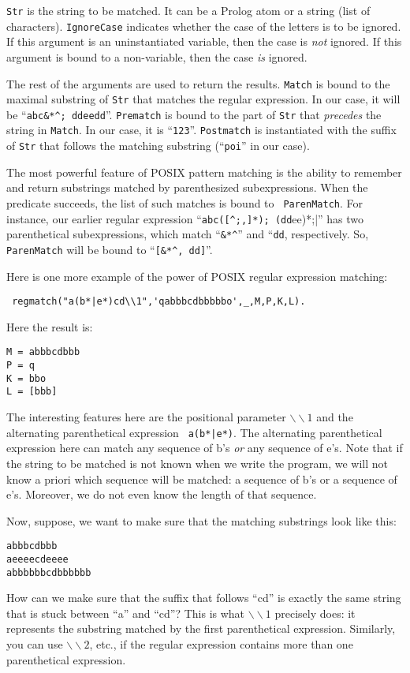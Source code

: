 {\tt Str} is the string to be matched. It can be a Prolog atom or a string
(list of characters). {\tt IgnoreCase} indicates whether
the case of the letters is to be ignored. If this argument is an
uninstantiated variable, then the case is \emph{not} ignored. If this
argument is bound to a non-variable, then the case \emph{is} ignored.

The rest of the arguments are used to return the results. {\tt Match} 
is bound to the maximal substring of {\tt Str} that matches the regular
expression. In our case, it will be ``\verb|abc&*^; ddeedd|''.
{\tt Prematch} is bound to the part of {\tt Str} that
\emph{precedes} the string in {\tt Match}. In our case, it is ``{\tt 123}''.
{\tt Postmatch} is
instantiated with the suffix of {\tt Str} that follows the matching
substring (``{\tt poi}'' in our case).

The most powerful feature of POSIX pattern matching is the ability to
remember and return substrings matched by parenthesized subexpressions.
When the predicate succeeds, the list of such matches is bound to {\tt
  ParenMatch}. For instance, our earlier regular expression 
  ``\verb|abc([^;,]*); (dd|ee)*;|'' has two parenthetical subexpressions, which
match ``\verb|&*^|'' and ``{\tt dd}, respectively. So, {\tt ParenMatch} will
be bound to ``\verb|[&*^, dd]|''.

Here is one more example of the power of POSIX regular expression matching:
\begin{verbatim}
 regmatch("a(b*|e*)cd\\1",'qabbbcdbbbbbo',_,M,P,K,L).  
\end{verbatim}
Here the result is:
\begin{verbatim}
M = abbbcdbbb
P = q
K = bbo
L = [bbb]  
\end{verbatim}
The interesting features here are the positional parameter
$\backslash\backslash 1$ and the alternating parenthetical expression {\tt
a(b*|e*)}. The alternating parenthetical expression here can match any
sequence of b's \emph{or} any sequence of e's. Note that if the string to
be matched is not known when we write the program, we will not know a
priori which sequence will be matched: a sequence of b's or a sequence of e's.
Moreover, we do not even know the length of that sequence.

Now, suppose, we want to make sure that the matching substrings look like this:
\begin{verbatim}
abbbcdbbb
aeeeecdeeee
abbbbbbcdbbbbbb
\end{verbatim}
How can we make sure that the suffix that follows ``cd'' is exactly the same
string that is stuck between ``a'' and ``cd''? This is what
$\backslash\backslash 1$ precisely does: it represents the substring
matched by the first parenthetical expression. Similarly, you can use
$\backslash\backslash 2$, etc., if the regular expression contains more
than one parenthetical expression.


